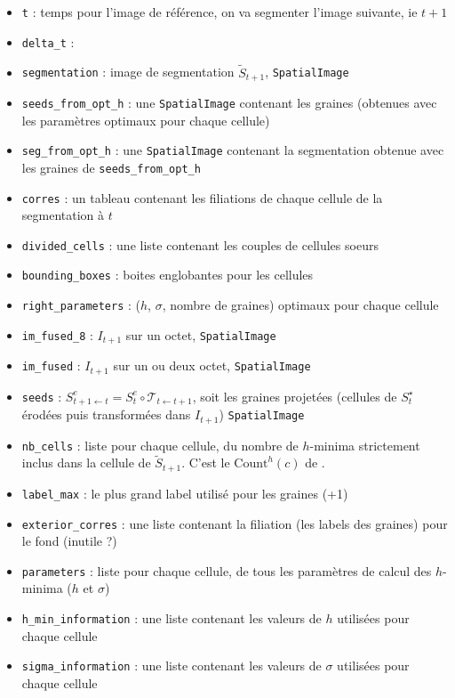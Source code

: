 \documentclass{article}
\begin{document}
\begin{itemize}
\itemsep -0.5ex
\item \verb|t| : temps pour l'image de r\'ef\'erence, on va segmenter l'image suivante, ie $t+1$
\item \verb|delta_t| : 
\item \verb|segmentation| : image de segmentation $\tilde{S}_{t+1}$, \texttt{SpatialImage}
\item \verb|seeds_from_opt_h| : une \texttt{SpatialImage} contenant les graines (obtenues avec les param\`etres optimaux pour chaque cellule)
\item \verb|seg_from_opt_h| : une \texttt{SpatialImage} contenant la segmentation obtenue avec les graines de \verb|seeds_from_opt_h| 
\item \verb|corres| : un tableau contenant les filiations de chaque cellule de la segmentation \`a $t$
\item \verb|divided_cells| : une liste contenant les couples de cellules soeurs
\item \verb|bounding_boxes| : boites englobantes pour les cellules
\item \verb|right_parameters| : ($h$, $\sigma$, nombre de graines) optimaux pour chaque cellule
\item \verb|im_fused_8| : $I_{t+1}$ sur un octet, \texttt{SpatialImage}
\item \verb|im_fused| : $I_{t+1}$ sur un ou deux octet, \texttt{SpatialImage}
\item \verb|seeds| : $S^e_{t+1 \leftarrow t} = S^e_t \circ \mathcal{T}_{t \leftarrow t+1}$, soit les graines projet\'ees (cellules de $S^{\star}_t$ \'erod\'ees puis transform\'ees dans $I_{t+1}$) \texttt{SpatialImage}
\item \verb|nb_cells| : liste pour chaque cellule, du nombre de $h$-minima strictement inclus dans la cellule de  $\tilde{S}_{t+1}$. C'est le $\mathrm{Count}^{h}(c)$ de \cite[section 2.3.3.5, page 71]{guignard:tel-01278725}.
\item \verb|label_max| :  le plus grand label utilisé pour les graines (+1)
\item \verb|exterior_corres| : une liste contenant la filiation (les labels des graines) pour le fond (inutile ?)
\item \verb|parameters| : liste pour chaque cellule,  de tous les param\`etres de calcul des $h$-minima ($h$ et $\sigma$)
\item \verb|h_min_information| : une liste contenant les valeurs de $h$ utilisées pour chaque cellule
\item \verb|sigma_information| : une liste contenant les valeurs de $\sigma$ utilisées pour chaque cellule

\end{itemize}
\end{document}
